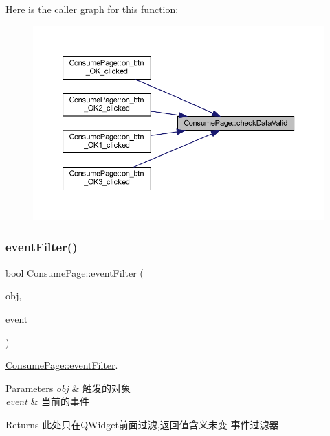 Here is the caller graph for this function\+:
\nopagebreak
\begin{figure}[H]
\begin{center}
\leavevmode
\includegraphics[width=350pt]{class_consume_page_a35a81e758924ebde005e01f78eda143f_icgraph}
\end{center}
\end{figure}
\mbox{\label{class_consume_page_a1c1ce4b09089b923deb0fd178418cb99}} 
\subsubsection{\texorpdfstring{eventFilter()}{eventFilter()}}
{\footnotesize\ttfamily bool Consume\+Page\+::event\+Filter (\begin{DoxyParamCaption}\item[{Q\+Object $\ast$}]{obj,  }\item[{Q\+Event $\ast$}]{event }\end{DoxyParamCaption})\hspace{0.3cm}{\ttfamily [protected]}}



\mbox{\hyperlink{class_consume_page_a1c1ce4b09089b923deb0fd178418cb99}{Consume\+Page\+::event\+Filter}}. 


\begin{DoxyParams}{Parameters}
{\em obj} & 触发的对象 \\
\hline
{\em event} & 当前的事件 \\
\hline
\end{DoxyParams}
\begin{DoxyReturn}{Returns}
此处只在\+Q\+Widget前面过滤,返回值含义未变 事件过滤器 
\end{DoxyReturn}
\mbox{\label{class_consume_page_a4b2cabc78b852bea679c71e0a8a1e459}} 

